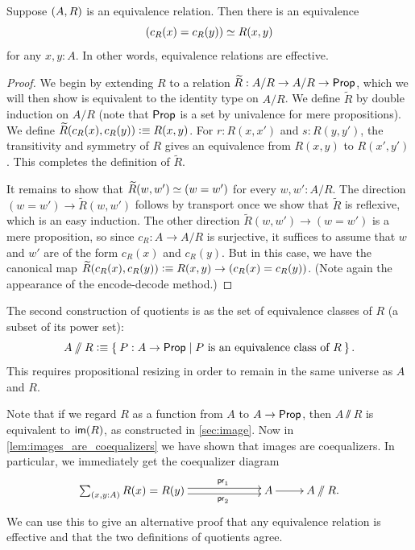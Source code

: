 \begin{lem}\label{lem:sets_exact}
Suppose ${\mathopen{}(A,R)\mathclose{}}$ is an equivalence relation. Then there is an equivalence
\begin{equation*}
(c_R(x)= c_R(y))\simeq R(x,y)
\end{equation*}
for any $x,y:A$. In other words, equivalence relations are effective.
\end{lem}

\begin{proof}
We begin by extending $R$ to a relation $\widetilde{R}:A/R\to A/R\to\mathsf{Prop}$, which we will then show is equivalent
to the identity type on $A/R$. We define $\widetilde{R}$ by double induction on
$A/R$ (note that $\mathsf{Prop}$ is a set by univalence for mere propositions). We
define $\widetilde{R}(c_R(x),c_R(y)) \vcentcolon\equiv R(x,y)$. For $r:R(x,x')$ and $s:R(y,y')$,
the transitivity and symmetry
of $R$ gives an equivalence from $R(x,y)$ to $R(x',y')$. This completes the
definition of $\widetilde{R}$.

It remains to show that $\widetilde{R}(w,w')\simeq (w= w')$ for every $w,w':A/R$.
The direction $(w=w')\to \widetilde{R}(w,w')$ follows by transport once we show that $\widetilde{R}$ is reflexive, which is an easy induction.
The other direction $\widetilde{R}(w,w')\to (w= w')$ is a mere proposition, so since $c_R:A\to A/R$ is surjective, it suffices to assume that $w$ and $w'$ are of the form $c_R(x)$ and $c_R(y)$.
But in this case, we have the canonical map $\widetilde{R}(c_R(x),c_R(y)) \vcentcolon\equiv R(x,y) \to (c_R(x)=c_R(y))$.
(Note again the appearance of the encode-decode method.)
\end{proof}

The second construction of quotients is as the set of equivalence classes of $R$ (a subset
of its power set):
\[ A\sslash R \defeq \setof{ P:A\to\prop | P \text{ is an equivalence class of } R}. \]
This requires propositional resizing in order to remain in the same universe as $A$ and $R$.

Note that if we regard $R$ as a function from $A$ to $A\to \mathsf{Prop}$, then $A\sslash R$ is equivalent to $\mathsf{im}(R)$, as constructed in \cref{sec:image}.
Now in \cref{lem:images_are_coequalizers} we have shown that images are
coequalizers. In particular, we immediately get the coequalizer diagram
\begin{equation*}
  \xymatrix{
    **[l]{\sm{x,y:A} R (x)= R (y)}
    \ar@<0.25em>[r]^{\proj1}
    \ar@<-0.25em>[r]_{\proj2}
    &
    {A}
    \ar[r]
    &
    {A \sslash R.}
  }
\end{equation*}
We can use this to give an alternative proof that any equivalence relation is effective and that the two definitions of quotients agree.

